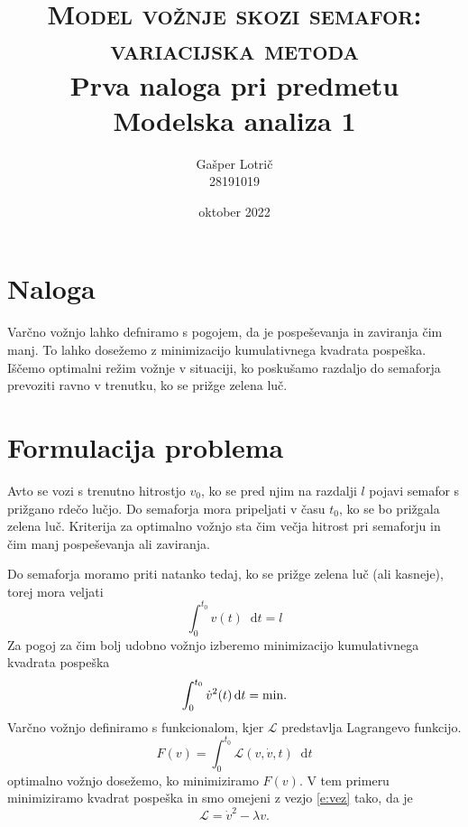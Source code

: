 \documentclass[a4paper, 12pt, slovene]{article}
\newcommand*\diff{\mathop{}\!\mathrm{d}}
\numberwithin{equation}{section}
\newcommand{\lag}{\mathcal{L}\!}
\begin{document}
\begin{titlepage}
\title{\textsc{Model vožnje skozi semafor: variacijska metoda} \\[1ex] \large Prva naloga pri predmetu Modelska analiza 1}
\author{Gašper Lotrič \\ 28191019}
\date{oktober 2022}

\maketitle
\end{titlepage}

\tableofcontents
\pagebreak


\section{Naloga}
Varčno vožnjo lahko defniramo s pogojem, da je pospeševanja in zaviranja čim manj. To lahko dosežemo z minimizacijo kumulativnega kvadrata pospeška. Iščemo optimalni režim vožnje v situaciji, ko poskušamo razdaljo do semaforja prevoziti ravno v trenutku, ko se prižge zelena luč.


\section{Formulacija problema}
Avto se vozi s trenutno hitrostjo $v_0$, ko se pred njim na razdalji $l$ pojavi semafor s prižgano rdečo lučjo. Do semaforja mora pripeljati v času $t_0$, ko se bo prižgala zelena luč. Kriterija za optimalno vožnjo sta čim večja hitrost pri semaforju in čim manj pospeševanja ali zaviranja.


Do semaforja moramo priti natanko tedaj, ko se prižge zelena luč (ali kasneje), torej mora veljati
\begin{equation}
\int_0^{t_0}v(t)\diff t = l
\label{e:vez}
\end{equation}
Za pogoj za čim bolj udobno vožnjo izberemo minimizacijo kumulativnega kvadrata pospeška
\begin{equation}
\int_0^{t_0}\dot{v}^2(t)\diff t = \rm{min.}
\end{equation}
Varčno vožnjo definiramo s funkcionalom, kjer $\lag$ predstavlja Lagrangevo funkcijo.
\begin{equation}
F(v) = \int_0^{t_0}\lag(v, \dot{v}, t)\diff t
\end{equation}
optimalno vožnjo dosežemo, ko minimiziramo $F(v)$. V tem primeru minimiziramo kvadrat pospeška in smo omejeni z vezjo \eqref{e:vez} tako, da je
\begin{equation}
\lag = \dot{v}^2 - \lambda v.
\end{equation}
\end{document}
